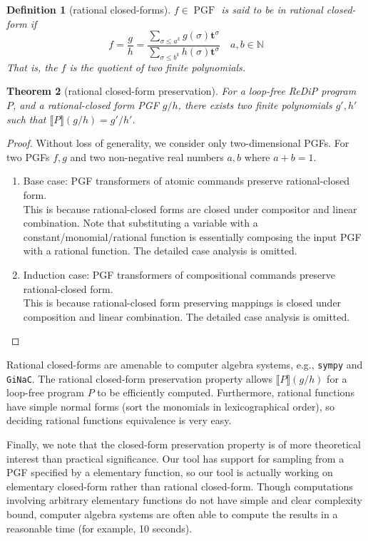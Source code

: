 \documentclass[a4paper]{article}
\DeclareMathOperator*{\PGF}{PGF}
\renewcommand{\S}[1]{ \llbracket #1 \rrbracket }
\newtheorem{theorem}{Theorem}[section]
\newtheorem{definition}[theorem]{Definition}
\begin{document}
\begin{definition}[rational closed-forms]
	\(f\in\PGF\) is said to be in rational closed-form if
	\[
		f = \frac{g}{h} = \dfrac{
			\sum_{\sigma \leq a^k} g(\sigma) \mathbf{t}^\sigma
		}{
			\sum_{\sigma \leq b^k} h(\sigma) \mathbf{t}^\sigma
		}
		\quad
		a,b \in \mathbb{N}
	\]
	That is, the \(f\) is the quotient of two finite polynomials.
\end{definition}

\begin{theorem}[rational closed-form preservation]
	For a loop-free ReDiP program \(P\), and a rational-closed form PGF \(g/h\),
	there exists two finite polynomials \(g',h'\) such that \(\S{P}(g/h) = g'/h'\).
\end{theorem}
\begin{proof}
	Without loss of generality, we consider only two-dimensional PGFs.
	For two PGFs \(f,g\) and two non-negative real numbers \(a,b\) where \(a+b=1\).
	\begin{enumerate}
		\item Base case: PGF transformers of atomic commands preserve rational-closed form.\\
		      This is because rational-closed forms are closed under compositor and linear combination.
		      Note that substituting a variable with a constant/monomial/rational function is essentially composing the input PGF with a rational function.
		      The detailed case analysis is omitted.
		\item Induction case: PGF transformers of compositional commands preserve rational-closed form.\\
		      This is because rational-closed form preserving mappings is closed under composition and linear combination.
		      The detailed case analysis is omitted.
	\end{enumerate}
\end{proof}

Rational closed-forms are amenable to computer algebra systems, e.g., \texttt{sympy} and \texttt{GiNaC}.
The rational closed-form preservation property allows \(\S{P}(g/h)\) for a loop-free program \(P\) to be efficiently computed.
Furthermore, rational functions have simple normal forms (sort the monomials in lexicographical order), so deciding rational functions equivalence is very easy.\par
Finally, we note that the closed-form preservation property is of more theoretical interest than practical significance.
Our tool has support for sampling from a PGF specified by a elementary function, so our tool is actually working on elementary closed-form rather than rational closed-form.
Though computations involving arbitrary elementary functions do not have simple and clear complexity bound, computer algebra systems are often able to compute the results in a reasonable time (for example, 10 seconds).
\end{document}
